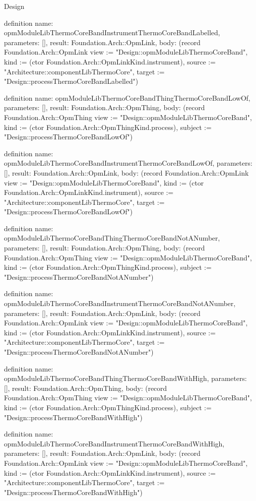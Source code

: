 \begin{lexlean}{Design}
\begin{semanticmodule}
definition{
  name: opmModuleLibThermoCoreBandInstrumentThermoCoreBandLabelled,
  parameters: [],
  result: Foundation.Arch::OpmLink,
  body: (record Foundation.Arch::OpmLink {view := "Design::opmModuleLibThermoCoreBand", kind := (ctor Foundation.Arch::OpmLinkKind.instrument), source := "Architecture::componentLibThermoCore", target := "Design::processThermoCoreBandLabelled"})
}

definition{
  name: opmModuleLibThermoCoreBandThingThermoCoreBandLowOf,
  parameters: [],
  result: Foundation.Arch::OpmThing,
  body: (record Foundation.Arch::OpmThing {view := "Design::opmModuleLibThermoCoreBand", kind := (ctor Foundation.Arch::OpmThingKind.process), subject := "Design::processThermoCoreBandLowOf"})
}

definition{
  name: opmModuleLibThermoCoreBandInstrumentThermoCoreBandLowOf,
  parameters: [],
  result: Foundation.Arch::OpmLink,
  body: (record Foundation.Arch::OpmLink {view := "Design::opmModuleLibThermoCoreBand", kind := (ctor Foundation.Arch::OpmLinkKind.instrument), source := "Architecture::componentLibThermoCore", target := "Design::processThermoCoreBandLowOf"})
}

definition{
  name: opmModuleLibThermoCoreBandThingThermoCoreBandNotANumber,
  parameters: [],
  result: Foundation.Arch::OpmThing,
  body: (record Foundation.Arch::OpmThing {view := "Design::opmModuleLibThermoCoreBand", kind := (ctor Foundation.Arch::OpmThingKind.process), subject := "Design::processThermoCoreBandNotANumber"})
}

definition{
  name: opmModuleLibThermoCoreBandInstrumentThermoCoreBandNotANumber,
  parameters: [],
  result: Foundation.Arch::OpmLink,
  body: (record Foundation.Arch::OpmLink {view := "Design::opmModuleLibThermoCoreBand", kind := (ctor Foundation.Arch::OpmLinkKind.instrument), source := "Architecture::componentLibThermoCore", target := "Design::processThermoCoreBandNotANumber"})
}

definition{
  name: opmModuleLibThermoCoreBandThingThermoCoreBandWithHigh,
  parameters: [],
  result: Foundation.Arch::OpmThing,
  body: (record Foundation.Arch::OpmThing {view := "Design::opmModuleLibThermoCoreBand", kind := (ctor Foundation.Arch::OpmThingKind.process), subject := "Design::processThermoCoreBandWithHigh"})
}

definition{
  name: opmModuleLibThermoCoreBandInstrumentThermoCoreBandWithHigh,
  parameters: [],
  result: Foundation.Arch::OpmLink,
  body: (record Foundation.Arch::OpmLink {view := "Design::opmModuleLibThermoCoreBand", kind := (ctor Foundation.Arch::OpmLinkKind.instrument), source := "Architecture::componentLibThermoCore", target := "Design::processThermoCoreBandWithHigh"})
}


\end{semanticmodule}
\end{lexlean}
